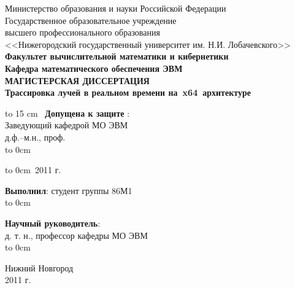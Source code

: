 \documentclass[12pt, a4paper, utf8]{article}
\begin{document}
\begin{titlepage}
\begin{center}
{Министерство образования и науки Российской Федерации\\ 
Государственное образовательное учреждение \\ 
высшего профессионального образования \\ 
<<Нижегородский государственный университет им. Н.И. Лобачевского>>\\

\bf{Факультет вычислительной математики и кибернетики\\
Кафедра математического обеспечения ЭВМ\\
}
\vspace{2em}
МАГИСТЕРСКАЯ ДИССЕРТАЦИЯ\\
}
{\bf \Large	\textsf{ Трассировка лучей в реальном времени на~x64~архитектуре \\ } }
\end{center}
\vspace{2em}
\begin{multicols}{2}
\vbox to 15 cm{\ }
\noindent 
{\bf Допущена к защите} : {\hrulefill}\\
Заведующий кафедрой МО ЭВМ \\
д.ф.--м.н., проф. \\

\vspace*{1em}
{ \noindent
\hspace*{1.5cm}\hbox to 0cm{}\hspace{-1.5cm}{\hrulefill\ \ Стронгин Р. Г. }
}

\vspace*{1em}
{ \noindent
\hbox to 0cm{\raisebox{0.25em}{<<\qquad \qquad \quad >>}}{\hrulefill\ 2011 г. }
}

\noindent
{\bf Выполнил}: студент группы 86М1 \\

\vspace*{0.5em}
{ \noindent
\hspace*{1.5cm}\hbox to 0cm{}\hspace{-1.5cm}{\hrulefill\ \ Морозов А. С. }
}

\vspace{1.5em}
\noindent
{\bf Научный руководитель}: \\
д. т. н., профессор кафедры МО ЭВМ \\

{ \noindent
\hspace*{1.5cm}\hbox to 0cm{}\hspace{-1.5cm}{\hrulefill\ \ Турлапов В. Е. }
}

\end{multicols}

\vfill 
\begin{center} 
{\rm Нижний Новгород \\ 2011 г.} 
\end {center} 
\end{titlepage} 
\end{document}
